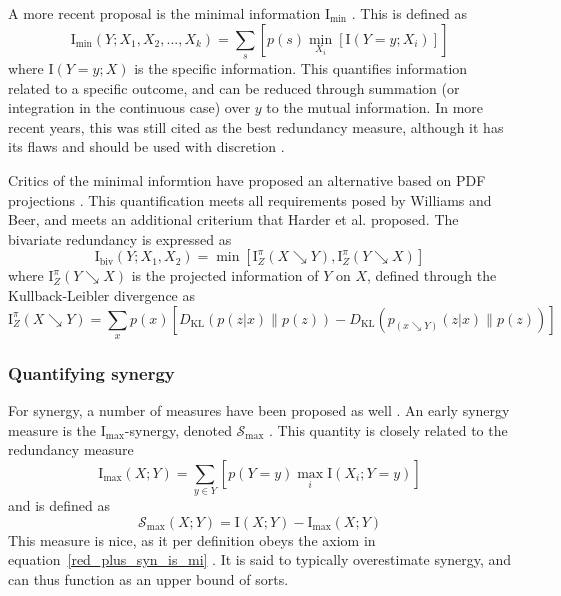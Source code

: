\documentclass[../main.tex]{subfiles}
\begin{document}
A more recent proposal is the minimal information $\mathrm{I}_\mathrm{min}$ \cite{williams2010nonnegative}.
This is defined as
%
\begin{equation}
\mathrm{I}_\mathrm{min}(Y;{X_1, X_2,...,X_k}) = \sum_s [p(s) \min_{X_i} [\mathrm{I}(Y=y;X_i)]]
\end{equation}
%
where $\mathrm{I}(Y = y;X)$ is the specific information.
This quantifies information related to a specific outcome, and can be reduced through summation (or integration in the continuous case) over $y$ to the mutual information.
In more recent years, this was still cited as the best redundancy measure, although it has its flaws and should be used with discretion \cite{lizier2013towards, olbrich2015information}.

Critics of the minimal informtion have proposed an alternative based on PDF projections \cite{harder2013bivariate}.
This quantification meets all requirements posed by Williams and Beer, and meets an additional criterium that Harder et al. proposed.
The bivariate redundancy is expressed as
%
\begin{equation}
\mathrm{I}_\mathrm{biv}(Y;{X_1, X_2}) = \min [\mathrm{I}_Z^\pi (X \searrow Y), \mathrm{I}_Z^\pi (Y \searrow X)] 
\end{equation}
%
where $\mathrm{I}_Z^\pi (Y \searrow X)$ is the projected information of $Y$ on $X$, defined through the Kullback-Leibler divergence as
%
\begin{equation}
\mathrm{I}_Z^\pi (X \searrow Y) = \sum_x p(x) [D_\mathrm{KL} (p(z|x) \| p(z)) - D_\mathrm{KL} (p_{(x \searrow Y)}(z|x) \| p(z))]
\end{equation}

\subsubsection{Quantifying synergy}

For synergy, a number of measures have been proposed as well \cite{griffith2014quantifying, olbrich2015information}.
An early synergy measure is the $\mathrm{I}_\mathrm{max}$-synergy, denoted $\mathcal{S}_\mathrm{max}$ \cite{williams2010nonnegative}.
This quantity is closely related to the redundancy measure
%
\begin{equation}
\mathrm{I}_\mathrm{max} (X; Y) = \sum_{y \in Y} [ p(Y = y) \max_i \mathrm{I} (X_i ; Y = y) ]
\end{equation}
%
and is defined as 
%
\begin{equation}
\mathcal{S}_\mathrm{max} (X;Y) = \mathrm{I}(X;Y) - \mathrm{I}_\mathrm{max} (X;Y)
\end{equation}
%
This measure is nice, as it per definition obeys the axiom in equation~\ref{red_plus_syn_is_mi} \cite{griffith2014quantifying}.
It is said to typically overestimate synergy, and can thus function as an upper bound of sorts.
\end{document}

